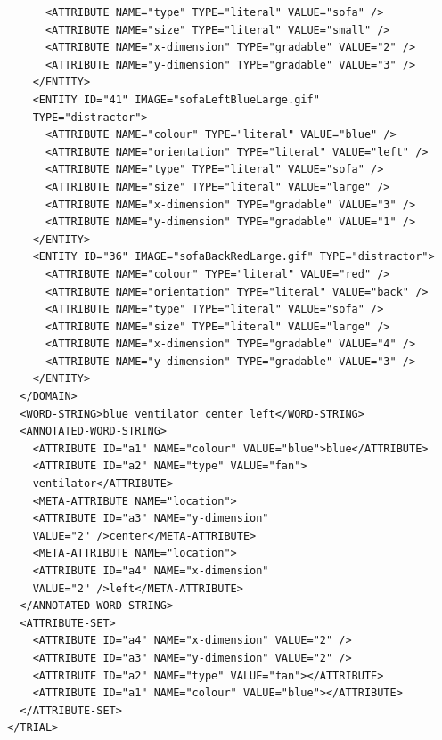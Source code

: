 \begin{verbatim}
      <ATTRIBUTE NAME="type" TYPE="literal" VALUE="sofa" />
      <ATTRIBUTE NAME="size" TYPE="literal" VALUE="small" />
      <ATTRIBUTE NAME="x-dimension" TYPE="gradable" VALUE="2" />
      <ATTRIBUTE NAME="y-dimension" TYPE="gradable" VALUE="3" />
    </ENTITY>
    <ENTITY ID="41" IMAGE="sofaLeftBlueLarge.gif"
    TYPE="distractor">
      <ATTRIBUTE NAME="colour" TYPE="literal" VALUE="blue" />
      <ATTRIBUTE NAME="orientation" TYPE="literal" VALUE="left" />
      <ATTRIBUTE NAME="type" TYPE="literal" VALUE="sofa" />
      <ATTRIBUTE NAME="size" TYPE="literal" VALUE="large" />
      <ATTRIBUTE NAME="x-dimension" TYPE="gradable" VALUE="3" />
      <ATTRIBUTE NAME="y-dimension" TYPE="gradable" VALUE="1" />
    </ENTITY>
    <ENTITY ID="36" IMAGE="sofaBackRedLarge.gif" TYPE="distractor">
      <ATTRIBUTE NAME="colour" TYPE="literal" VALUE="red" />
      <ATTRIBUTE NAME="orientation" TYPE="literal" VALUE="back" />
      <ATTRIBUTE NAME="type" TYPE="literal" VALUE="sofa" />
      <ATTRIBUTE NAME="size" TYPE="literal" VALUE="large" />
      <ATTRIBUTE NAME="x-dimension" TYPE="gradable" VALUE="4" />
      <ATTRIBUTE NAME="y-dimension" TYPE="gradable" VALUE="3" />
    </ENTITY>
  </DOMAIN>
  <WORD-STRING>blue ventilator center left</WORD-STRING>
  <ANNOTATED-WORD-STRING>
    <ATTRIBUTE ID="a1" NAME="colour" VALUE="blue">blue</ATTRIBUTE>
    <ATTRIBUTE ID="a2" NAME="type" VALUE="fan">
    ventilator</ATTRIBUTE>
    <META-ATTRIBUTE NAME="location">
    <ATTRIBUTE ID="a3" NAME="y-dimension"
    VALUE="2" />center</META-ATTRIBUTE>
    <META-ATTRIBUTE NAME="location">
    <ATTRIBUTE ID="a4" NAME="x-dimension"
    VALUE="2" />left</META-ATTRIBUTE>
  </ANNOTATED-WORD-STRING>
  <ATTRIBUTE-SET>
    <ATTRIBUTE ID="a4" NAME="x-dimension" VALUE="2" />
    <ATTRIBUTE ID="a3" NAME="y-dimension" VALUE="2" />
    <ATTRIBUTE ID="a2" NAME="type" VALUE="fan"></ATTRIBUTE>
    <ATTRIBUTE ID="a1" NAME="colour" VALUE="blue"></ATTRIBUTE>
  </ATTRIBUTE-SET>
</TRIAL>
\end{verbatim}


